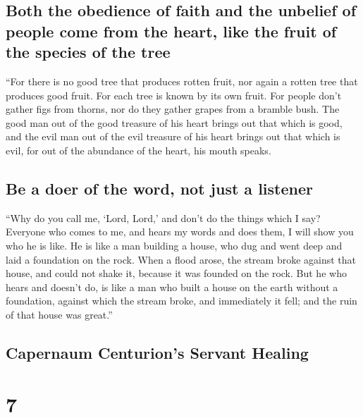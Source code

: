 \hypertarget{both-the-obedience-of-faith-and-the-unbelief-of-people-come-from-the-heart-like-the-fruit-of-the-species-of-the-tree}{%
\subsection{Both the obedience of faith and the unbelief of people come
from the heart, like the fruit of the species of the
tree}\label{both-the-obedience-of-faith-and-the-unbelief-of-people-come-from-the-heart-like-the-fruit-of-the-species-of-the-tree}}

 ``For there is no good tree that produces rotten fruit,
nor again a rotten tree that produces good fruit.  For
each tree is known by its own fruit. For people don't gather figs from
thorns, nor do they gather grapes from a bramble bush. 
The good man out of the good treasure of his heart brings out that which
is good, and the evil man out of the evil treasure of his heart brings
out that which is evil, for out of the abundance of the heart, his mouth
speaks.

\hypertarget{be-a-doer-of-the-word-not-just-a-listener}{%
\subsection{Be a doer of the word, not just a
listener}\label{be-a-doer-of-the-word-not-just-a-listener}}

 ``Why do you call me, `Lord, Lord,' and don't do the
things which I say?  Everyone who comes to me, and hears
my words and does them, I will show you who he is like. 
He is like a man building a house, who dug and went deep and laid a
foundation on the rock. When a flood arose, the stream broke against
that house, and could not shake it, because it was founded on the rock.
 But he who hears and doesn't do, is like a man who built
a house on the earth without a foundation, against which the stream
broke, and immediately it fell; and the ruin of that house was great.''

\hypertarget{capernaum-centurions-servant-healing}{%
\subsection{Capernaum Centurion's Servant
Healing}\label{capernaum-centurions-servant-healing}}

\hypertarget{section-6}{%
\section{7}\label{section-6}}

